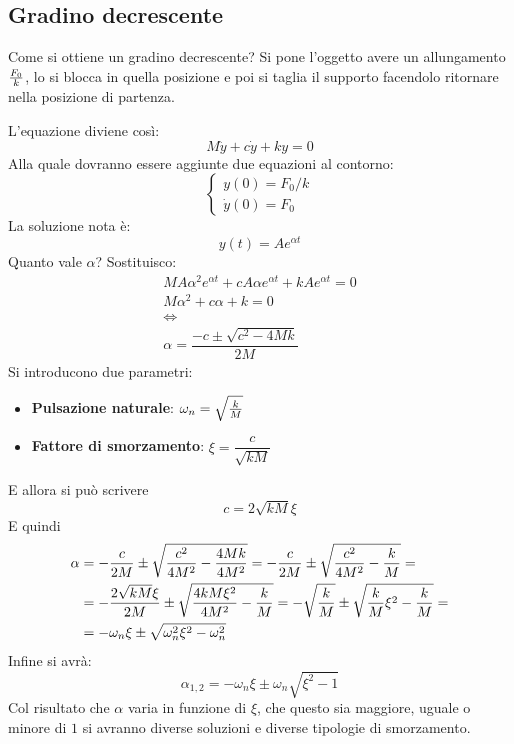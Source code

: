 \documentclass[a4paper, 15pt]{article}
\begin{document}
\subsection{Gradino decrescente} 	
\begin{adjustwidth}{2in}{} 	
	Come si ottiene un gradino decrescente? Si pone l'oggetto avere un allungamento ${F_0\over k}$, lo si blocca in quella posizione e poi si taglia il supporto facendolo ritornare nella posizione di partenza.
	
	L'equazione diviene così:
	\[ M\ddot{y} + c\dot{y} + ky =0\]
	Alla quale dovranno essere aggiunte due equazioni al contorno:
	\[ \begin{cases}
		y(0)=F_0/k \\
		\dot{y}(0) = F_0
	\end{cases}\]
	La soluzione nota è: 
	\[ y(t)=Ae^{\alpha t}\]
	Quanto vale $\alpha$? Sostituisco:
	\begin{eqnarray*}
		MA\alpha^2e^{\alpha t} + cA\alpha e^{\alpha t} + kAe^{\alpha t}  = 0 \\
		M\alpha^2 + c\alpha + k = 0 \\
		\Leftrightarrow \\
		\alpha  =\dfrac{-c \pm \sqrt{c^2 - 4Mk}}{2M}
	\end{eqnarray*}
	Si introducono due parametri:
	\begin{itemize}
		\item \textbf{Pulsazione naturale}: \(\omega_n = \sqrt{k\over M}\)
		\item \textbf{Fattore di smorzamento}: \( \xi = \dfrac{c}{\sqrt{kM}}\)
	\end{itemize}
	E allora si può scrivere \[c = 2\sqrt{kM}\xi\]
	\newpage
	E quindi
	\[ \begin{split}
		\alpha & = -{c\over 2M} \pm \sqrt{{c^2\over 4M^2} - {4Mk\over 4M^2}} = -{c\over 2M} \pm \sqrt{{c^2\over 4M^2} - {k\over M}} = \\
		& = -{2\sqrt{kM}\xi\over 2M} \pm \sqrt{{4kM\xi^2\over 4M^2} - {k\over M}} = -\sqrt{k\over M} \pm \sqrt{{k\over M}\xi^2 - {k\over M}} =  \\
		& = -\omega_n\xi \pm \sqrt{\omega^2_n\xi^2 - \omega^2_n} 
	\end{split} \]
	Infine si avrà:
	\[\alpha_{1,2}= -\omega_n\xi \pm \omega_n\sqrt{\xi^2 - 1}\]
	Col risultato che $\alpha$ varia in funzione di $\xi$, che questo sia maggiore, uguale o minore di $1$ si avranno diverse soluzioni e diverse tipologie di smorzamento.  
	\begin{enumerate}[label=(\Roman*)]

\end{enumerate}
\end{adjustwidth}
\end{document}

